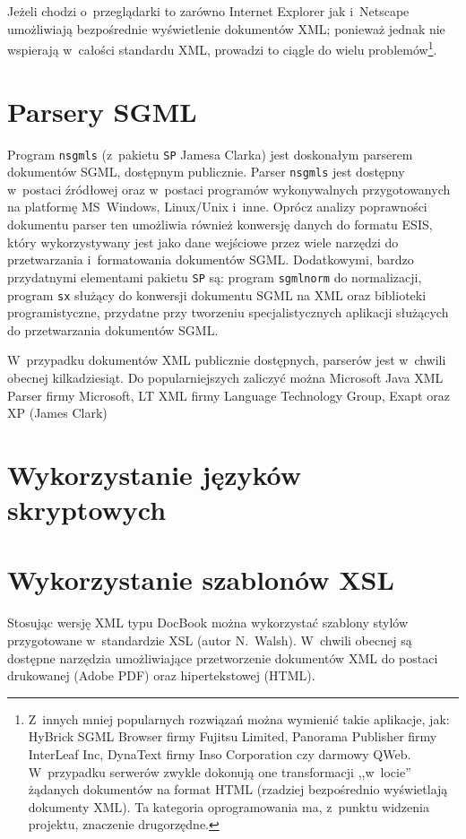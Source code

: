 \documentclass[document]{xmgr}
\begin{document}
Jeżeli chodzi o~przeglądarki to zarówno Internet Explorer jak
i~Netscape umożliwiają bezpośrednie wyświetlenie dokumentów XML;
ponieważ jednak nie wspierają w~całości standardu XML, prowadzi to
ciągle do wielu problemów\footnote{Z~innych mniej popularnych
  rozwiązań można wymienić takie aplikacje, jak: HyBrick SGML
  Browser firmy Fujitsu Limited, Panorama Publisher firmy InterLeaf
  Inc, DynaText firmy Inso Corporation czy darmowy QWeb. W~przypadku
  serwerów zwykle dokonują one transformacji ,,w~locie'' żądanych
  dokumentów na format HTML (rzadziej bezpośrednio wyświetlają
  dokumenty XML).  Ta kategoria oprogramowania ma, z~punktu widzenia
  projektu, znaczenie drugorzędne.}.

\section{Parsery SGML}
Program \texttt{nsgmls} (z~pakietu \texttt{SP} Jamesa Clarka) jest
doskonałym parserem dokumentów SGML, dostępnym
publicznie.  Parser \texttt{nsgmls} jest dostępny w~postaci źródłowej
oraz w~postaci programów wykonywalnych przygotowanych na platformę
MS~Windows, Linux/Unix i~inne. Oprócz analizy poprawności dokumentu
parser ten umożliwia również konwersję danych do formatu
ESIS, który wykorzystywany jest jako dane wejściowe przez
wiele narzędzi do przetwarzania i~formatowania dokumentów SGML.
Dodatkowymi, bardzo przydatnymi elementami pakietu \texttt{SP} są:
program \texttt{sgmlnorm} do normalizacji, program \texttt{sx} służący
do konwersji dokumentu SGML na XML oraz biblioteki programistyczne,
przydatne przy tworzeniu specjalistycznych aplikacji służących do
przetwarzania dokumentów SGML.

W~przypadku dokumentów XML publicznie dostępnych, parserów jest
w~chwili obecnej kilkadziesiąt. Do popularniejszych zaliczyć można
Microsoft Java XML Parser firmy Microsoft, LT XML firmy Language
Technology Group, Exapt oraz XP (James Clark)

\section{Wykorzystanie języków skryptowych}

\section{Wykorzystanie szablonów XSL}

Stosując wersję XML typu DocBook można wykorzystać szablony stylów
przygotowane w~standardzie XSL (autor N.~Walsh). W~chwili obecnej
są dostępne narzędzia umożliwiające przetworzenie dokumentów XML do
postaci drukowanej (Adobe PDF) oraz hipertekstowej (HTML).
\end{document}
